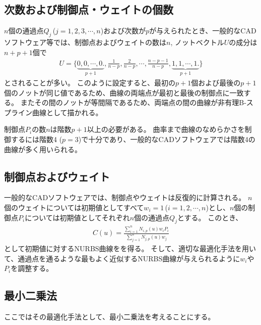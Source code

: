 \subsection{次数および制御点・ウェイトの個数}
$n$個の通過点$Q_j$\,($j = 1, 2, 3, \cdots, n$)および次数が$p$が与えられたとき、一般的なCADソフトウェア等では、制御点およびウェイトの数は$n$, ノットベクトル$U$の成分は$n+p+1$個で
\begin{align*}
  U = \bigg\{
      \underbrace{0, 0, \cdots, 0\bigg.}_{p+1},
      \frac1{n-p}, \frac2{n-p}, \cdots, \frac{n-p-1}{n-p},
      \underbrace{1, 1, \cdots, 1\bigg.}_{p+1}
      \bigg\}
\end{align*}
とされることが多い。
このように設定すると、最初の$p+1$個および最後の$p+1$個のノットが同じ値であるため、曲線の両端点が最初と最後の制御点に一致する。
またその間のノットが等間隔であるため、両端点の間の曲線が非有理B-スプライン曲線として描かれる。
\begin{hosoku}
制御点$P_i$の数$n$は階数$p+1$以上の必要がある。
曲率まで曲線のなめらかさを制御するには階数4 ($p = 3$)で十分であり、一般的なCADソフトウェアでは階数4の曲線が多く用いられる。
\end{hosoku}


\subsection{制御点およびウェイト}
一般的なCADソフトウェアでは、制御点やウェイトは反復的に計算される。
$n$個のウェイトについては初期値としてすべて$w_i = 1$\,($i = 1, 2, \cdots, n$)とし、$n$個の制御点$P_i$については初期値としてそれぞれ$n$個の通過点$Q_j$とする。
このとき、
\begin{align*}
  C(u) = \frac{\displaystyle\sum_{i=1}^nN_{i, p}(u)w_iP_i}{\displaystyle\sum_{j=1}^nN_{j, p}(u)w_j}
\end{align*}
として初期値に対するNURBS曲線をを得る。
そして、適切な最適化手法を用いて、通過点を通るような最もよく近似するNURBS曲線が与えられるように$w_i$や$P_i$を調整する。


\clearpage
\subsection{最小二乗法\TBW}
ここではその最適化手法として、最小二乗法を考えることにする。


